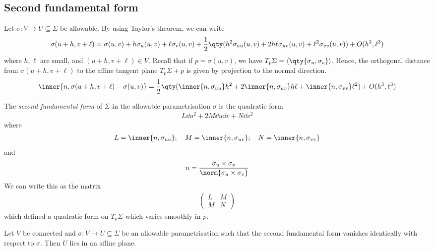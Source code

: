 \subsection{Second fundamental form}
Let $\sigma \colon V \to U \subseteq \Sigma$ be allowable.
By using Taylor's theorem, we can write
\begin{align*}
	\sigma(u+h,v+\ell) = \sigma(u,v) + h \sigma_u(u,v) + \ell \sigma_v(u,v) + \frac{1}{2} \qty(h^2 \sigma_{uu}(u,v) + 2h\ell \sigma_{uv}(u,v) + \ell^2 \sigma_{vv}(u,v)) + O(h^3,\ell^3)
\end{align*}
where $h,\ell$ are small, and $(u+h,v+\ell) \in V$.
Recall that if $p = \sigma(u,v)$, we have $T_p \Sigma = \genset{\qty{\sigma_u,\sigma_v}}$.
Hence, the orthogonal distance from $\sigma(u+h,v+\ell)$ to the affine tangent plane $T_p \Sigma + p$ is given by projection to the normal direction.
\begin{align*}
	\inner{n,\sigma(u+h,v+\ell) - \sigma(u,v)} = \frac{1}{2} \qty(\inner{n,\sigma_{uu}} h^2 + 2\inner{n,\sigma_{uv}} h\ell + \inner{n,\sigma_{vv}}\ell^2) + O(h^3,\ell^3)
\end{align*}
\begin{definition}
	The \textit{second fundamental form} of $\Sigma$ in the allowable parametrisation $\sigma$ is the quadratic form
	\begin{align*}
		L \dd{u}^2 + 2 M \dd{u} \dd{v} + N \dd{v}^2
	\end{align*}
	where
	\begin{align*}
		L = \inner{n,\sigma_{uu}};\quad M = \inner{n,\sigma_{uv}};\quad N = \inner{n,\sigma_{vv}}
	\end{align*}
	and
	\begin{align*}
		n = \frac{\sigma_u \times \sigma_v}{\norm{\sigma_u \times \sigma_v}}
	\end{align*}
	We can write this as the matrix
	\begin{align*}
		\begin{pmatrix}
			L & M \\
			M & N
		\end{pmatrix}
	\end{align*}
	which defined a quadratic form on $T_p \Sigma$ which varies smoothly in $p$.
\end{definition}
\begin{lemma}
	Let $V$ be connected and $\sigma \colon V \to U \subseteq \Sigma$ be an allowable parametrisation such that the second fundamental form vanishes identically with respect to $\sigma$.
	Then $U$ lies in an affine plane.
\end{lemma}
